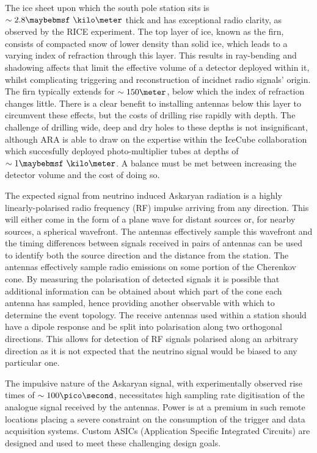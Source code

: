 The ice sheet upon which the south pole station sits is $\sim 2.8 \km$ thick and has exceptional radio clarity, as observed by the RICE experiment. The top layer of ice, known as the firn, consists of compacted snow of lower density than solid ice, which leads to a varying index of refraction through this layer. This results in ray-bending and shadowing affects that limit the effective volume of a detector deployed within it, whilst complicating triggering and reconstruction of incidnet radio signals' origin. The firn typically extends for $\sim 150 \meter$, below which the index of refraction changes little. There is a clear benefit to installing antennas below this layer to circumvent these effects, but the costs of drilling rise rapidly with depth. The challenge of drilling wide, deep and dry holes to these depths is not insignificant, although ARA is able to draw on the expertise within the IceCube collaboration which succesfully deployed photo-multiplier tubes at depths of $\sim 1 \km$. A balance must be met between increasing the detector volume and the cost of doing so.



The expected signal from neutrino induced Askaryan radiation is a highly linearly-polarised radio frequency (RF) impulse arriving from any direction. This will either come in the form of a plane wave for distant sources or, for nearby sources, a spherical wavefront. The antennas effectively sample this wavefront and the timing differences between signals received in pairs of antennas can be used to identify both the source direction and the distance from the station. The antennas effectively sample radio emissions on some portion of the Cherenkov cone. By measuring the polarisation of detected signals it is possible that additional information can be obtained about which part of the cone each antenna has sampled, hence providing another observable with which to determine the event topology. The receive antennas used within a station should have a dipole response and be split into polarisation along two orthogonal directions. This allows for detection of RF signals polarised along an arbitrary direction as it is not expected that the neutrino signal would be biased to any particular one.

The impulsive nature of the Askaryan signal, with experimentally observed rise times of $\sim 100 \pico \second$, necessitates high sampling rate digitisation of the analogue signal received by the antennas. Power is at a premium in such remote locations placing a severe constraint on the consumption of the trigger and data acquisition systems. Custom ASICs (Application Specific Integrated Circuits) are designed and used to meet these challenging design goals.

